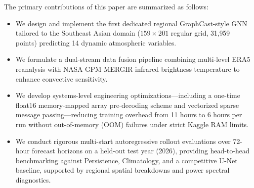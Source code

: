 The primary contributions of this paper are summarized as follows:
\begin{itemize}
    \item We design and implement the first dedicated regional GraphCast-style GNN tailored to the Southeast Asian domain ($159 \times 201$ regular grid, 31,959 points) predicting 14 dynamic atmospheric variables.
    \item We formulate a dual-stream data fusion pipeline combining multi-level ERA5 reanalysis with NASA GPM MERGIR infrared brightness temperature to enhance convective sensitivity.
    \item We develop systems-level engineering optimizations—including a one-time float16 memory-mapped array pre-decoding scheme and vectorized sparse message passing—reducing training overhead from 11 hours to 6 hours per run without out-of-memory (OOM) failures under strict Kaggle RAM limits.
    \item We conduct rigorous multi-start autoregressive rollout evaluations over 72-hour forecast horizons on a held-out test year (2026), providing head-to-head benchmarking against Persistence, Climatology, and a competitive U-Net baseline, supported by regional spatial breakdowns and power spectral diagnostics.
\end{itemize}
